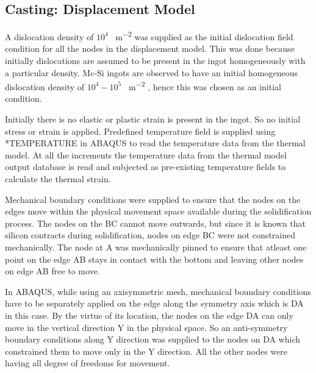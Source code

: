 \subsection{Casting: Displacement Model}

A dislocation density of $10^4$ \SI{}{m^{-2}} was supplied as the initial dislocation field condition for all the nodes in the displacement model. This was done because initially dislocations are assumed to be present in the ingot homogeneously with a particular density. Mc-Si ingots are observed to have an initial homogeneous dislocation density of $10^4-10^{5}$ \SI{}{m^{-2}} \cite{nakano2011numerical}, hence this was chosen as an initial condition.

Initially there is no elastic or plastic strain is present in the ingot. So no initial stress or strain is applied. Predefined temperature field is supplied using *TEMPERATURE in ABAQUS to read the temperature data from the thermal model. At all the increments the temperature data from the thermal model output database is read and subjected as pre-existing temperature fields to calculate the thermal strain.

Mechanical boundary conditions were supplied to ensure that the nodes on the edges move within the physical movement space available during the solidification process. The nodes on the BC cannot move outwards, but since it is known that silicon contracts during solidification, nodes on edge BC were not constrained mechanically. The node at A was mechanically pinned to ensure that atleast one point on the edge AB stays in contact with the bottom and leaving other nodes on edge AB free to move. 

In ABAQUS, while using an axisymmetric mesh, mechanical boundary conditions have to be separately applied on the edge along the symmetry axis which is DA in this case. By the virtue of its location, the nodes on the edge DA can only move in the vertical direction Y in the physical space. So an anti-symmetry boundary conditions along Y direction was supplied to the nodes on DA which constrained them to move only in the Y direction. All the other nodes were having all degree of freedoms for movement. 


